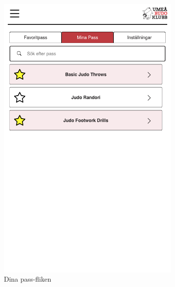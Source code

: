 \documentclass{article}
\begin{document}
{\begin{figure}[h]
{\begin{subfigure}[b]{0.3\textwidth}
                 \includegraphics[width=\textwidth]{images/Screens/UserWorkouts.png}
                 \caption{Dina pass-fliken}
                 \label{fig:userWorkouts}
             \end{subfigure}
             \hfill
             \begin{subfigure}[b]{0.3\textwidth}
                 \centering

\end{subfigure}}
\end{figure}}
\end{document}
